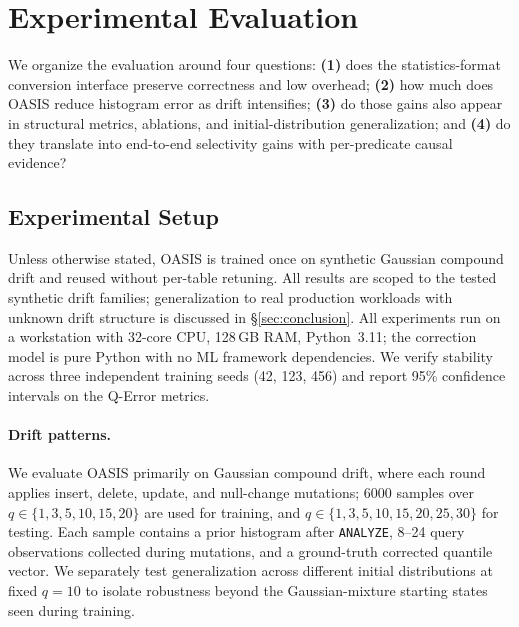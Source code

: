 \documentclass[runningheads]{llncs}
\begin{document}
\section{Experimental Evaluation}
\label{sec:experiments}

We organize the evaluation around four questions: \textbf{(1)} does the statistics-format conversion interface preserve correctness and low overhead; \textbf{(2)} how much does OASIS reduce histogram error as drift intensifies; \textbf{(3)} do those gains also appear in structural metrics, ablations, and initial-distribution generalization; and \textbf{(4)} do they translate into end-to-end selectivity gains with per-predicate causal evidence?

\subsection{Experimental Setup}
\label{sec:setup}

Unless otherwise stated, OASIS is trained once on synthetic Gaussian compound drift and reused without per-table retuning. All results are scoped to the tested synthetic drift families; generalization to real production workloads with unknown drift structure is discussed in \S\ref{sec:conclusion}. All experiments run on a workstation with 32-core CPU, 128\,GB RAM, Python~3.11; the correction model is pure Python with no ML framework dependencies. We verify stability across three independent training seeds (42, 123, 456) and report 95\% confidence intervals on the Q-Error metrics.

\paragraph{Drift patterns.}
We evaluate OASIS primarily on Gaussian compound drift, where each round applies insert, delete, update, and null-change mutations; 6000 samples over $q{\in}\{1,3,5,10,15,20\}$ are used for training, and $q{\in}\{1,3,5,10,15,20,25,30\}$ for testing. Each sample contains a prior histogram after \texttt{ANALYZE}, 8--24 query observations collected during mutations, and a ground-truth corrected quantile vector. We separately test generalization across different initial distributions at fixed $q{=}10$ to isolate robustness beyond the Gaussian-mixture starting states seen during training.
\end{document}

